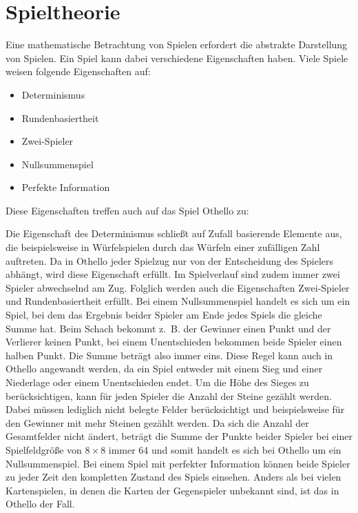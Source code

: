 \section{Spieltheorie}
\label{sec:spieltheorie}

Eine mathematische Betrachtung von Spielen erfordert die abstrakte Darstellung von Spielen. Ein Spiel kann dabei
verschiedene Eigenschaften haben. Viele Spiele weisen folgende Eigenschaften auf:

\begin{itemize}
    \item Determinismus
    \item Rundenbasiertheit
    \item Zwei-Spieler
    \item Nullsummenspiel
    \item Perfekte Information
\end{itemize}

Diese Eigenschaften treffen auch auf das Spiel Othello zu:

Die Eigenschaft des Determinismus schließt auf Zufall basierende Elemente aus, die beispielsweise in Würfelspielen durch
das Würfeln einer zufälligen Zahl auftreten. Da in Othello jeder Spielzug nur von der Entscheidung des Spielers abhängt,
wird diese Eigenschaft erfüllt. Im Spielverlauf sind zudem immer zwei Spieler abwechselnd am Zug. Folglich werden auch
die Eigenschaften Zwei-Spieler und Rundenbasiertheit erfüllt. Bei einem Nullsummenspiel handelt es sich um ein
Spiel, bei dem das Ergebnis beider Spieler am Ende jedes Spiels die gleiche Summe hat. Beim Schach bekommt z. B. der
Gewinner einen Punkt und der Verlierer keinen Punkt, bei einem Unentschieden bekommen beide Spieler einen halben Punkt.
Die Summe beträgt also immer eins. Diese Regel kann auch in Othello angewandt werden, da ein Spiel entweder mit einem
Sieg und einer Niederlage oder einem Unentschieden endet. Um die Höhe des Sieges zu berücksichtigen, kann für jeden
Spieler die Anzahl der Steine gezählt werden. Dabei müssen lediglich nicht belegte Felder berücksichtigt und
beispielsweise für den Gewinner mit mehr Steinen gezählt werden. Da sich die Anzahl der Gesamtfelder nicht ändert,
beträgt die Summe der Punkte beider Spieler bei einer Spielfeldgröße von $8\times 8$ immer 64 und somit handelt es sich
bei Othello um ein Nullsummenspiel. Bei einem Spiel mit perfekter Information können beide Spieler zu jeder Zeit den
kompletten Zustand des Spiels einsehen. Anders als bei vielen Kartenspielen, in denen die Karten der
Gegenspieler unbekannt sind, ist das in Othello der Fall.
\cite[S.~161f.]{ai2010russel}

